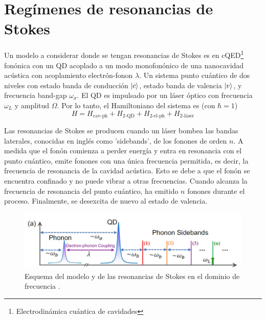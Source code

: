 \documentclass[../main.tex]{subfiles}
\begin{document}
\section{Regímenes de resonancias de Stokes} \label{sec:resonancesStokes}
Un modelo a considerar donde se tengan resonancias de Stokes es en cQED\footnote{Electrodinámica cuántica de cavidades} fonónica con un QD acoplado a un modo monofonónico de una nanocavidad acústica con acoplamiento electrón-fonon $\lambda$. Un sistema punto cuántico de dos niveles con estado banda de conducción $\ket{c}$, estado banda de valencia $\ket{v}$, y frecuencia band-gap $\omega_\sigma$. El QD es impulsado por un láser óptico con frecuencia $\omega_L$ y amplitud $\Omega$. Por lo tanto, el Hamiltoniano del sistema es (con $\hbar=1$) \parencite{Bin2020}
\begin{equation}
	H = H_\text{cav-ph} + H_\text{2-QD} + H_\text{2-el-ph} + H_\text{2-láser}
\end{equation}

Las resonancias de Stokes se producen cuando un láser bombea las bandas laterales, conocidas en inglés como 'sidebands', de los fonones de orden $n$. A medida que el fonón comienza a perder energía y entra en resonancia con el punto cuántico, emite fonones con una única frecuencia permitida, es decir, la frecuencia de resonancia de la cavidad acústica. Esto se debe a que el fonón se encuentra confinado y no puede vibrar a otras frecuencias. Cuando alcanza la frecuencia de resonancia del punto cuántico, ha emitido $n$ fonones durante el proceso. Finalmente, se desexcita de nuevo al estado de valencia.

\begin{figure}[th]
	\centering
	\includegraphics[width=0.85\linewidth]{img/resonancesStokes}
	\caption{Esquema del modelo y de las resonancias de Stokes en el dominio de frecuencia \parencite{Bin2020}.}
	\label{fig:resonancesstokes}
\end{figure}
\end{document}
